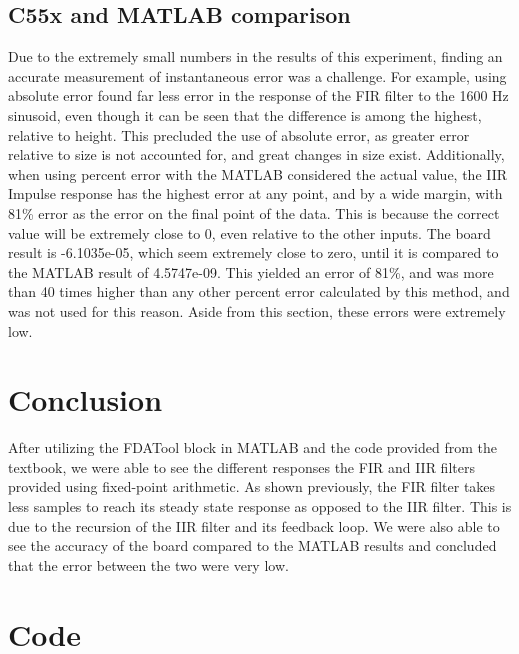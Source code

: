 \documentclass{bannerReport}
\begin{document}
\subsection{C55x and MATLAB comparison}
Due to the extremely small numbers in the results of this experiment, finding an accurate measurement of instantaneous error was a challenge. For example, using absolute error found far less error in the response of the FIR filter to the 1600 Hz sinusoid, even though it can be seen that the difference is among the highest, relative to height. This precluded the use of absolute error, as greater error relative to size is not accounted for, and great changes in size exist. Additionally, when using percent error with the MATLAB considered the actual value, the IIR Impulse response has the highest error at any point, and by a wide margin, with 81\% error as the error on the final point of the data. This is because the correct value will be extremely close to 0, even relative to the other inputs. The board result is -6.1035e-05, which seem extremely close to zero, until it is compared to the MATLAB result of 4.5747e-09. This yielded an error of 81\%, and was more than 40 times higher than any other percent error calculated by this method, and was not used for this reason. Aside from this section, these errors were extremely low.

\section{Conclusion}
After utilizing the FDATool block in MATLAB and the code provided from the textbook, we were able to see the different responses the FIR and IIR filters provided using fixed-point arithmetic. As shown previously, the FIR filter takes less samples to reach its steady state response as opposed to the IIR filter. This is due to the recursion of the IIR filter and its feedback loop. We were also able to see the accuracy of the board compared to the MATLAB results and concluded that the error between the two were very low.


\onecolumn
\section{Code}
\end{document}
